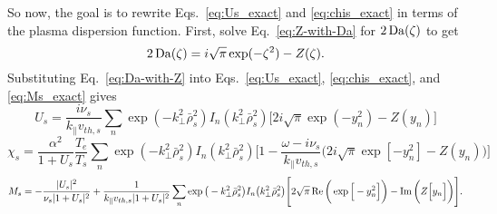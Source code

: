 So now, the goal is to rewrite Eqs.~\ref{eq:Us_exact} and \ref{eq:chis_exact} in terms of the plasma dispersion function.
First, solve Eq.~\ref{eq:Z-with-Da} for $2\operatorname{Da}(\zeta)$ to get
\begin{equation}
	2\operatorname{Da}(\zeta) = i\sqrt{\pi} \exp(-\zeta^2) -Z(\zeta).
	\label{eq:Da-with-Z}
\end{equation}
Substituting Eq.~\ref{eq:Da-with-Z} into Eqs.~\ref{eq:Us_exact}, \ref{eq:chis_exact}, and \ref{eq:Ms_exact} gives
\begin{equation}
	U_s = 
	\frac{i \nu_{s}}{k_\parallel v_{th,s}} 
	\sum_n \exp(-k_\perp^2 \bar{\rho}_s^2) I_n (k_\perp^2 \bar{\rho}_s^2) 
	\Big[ 2 i \sqrt{\pi} \exp(-y_n^2) - Z(y_n)\Big]
	\label{eq:Us_exact_Z}
\end{equation}
\begin{equation}
	\chi_s = 
	\frac{\alpha^2}{1+U_s} \frac{T_e}{T_s} 
	\sum_n \exp(-k_\perp^2 \bar{\rho}_s^2) I_n (k_\perp^2 \bar{\rho}_s^2) 
	\bigg[ 1 - \frac{\omega-i\nu_s}{k_\parallel v_{th,s}} 
	\Big( 2 i \sqrt{\pi} \exp[-y_n^2] - Z(y_n) \Big)
	\bigg]
	\label{eq:chis_exact_Z}
\end{equation}
\begin{equation}
	M_s = - \frac{|U_s|^2}{\nu_s |1+U_s|^2} 
	+ \frac{1}{k_\parallel v_{th,s} |1+U_s|^2}
	\sum_n \exp \big(-k_\perp^2 \bar{\rho}^2_s \big)
	I_n \big( k_\perp^2 \bar{\rho}^2_s \big)
	\Bigg[ 2\sqrt{\pi} \operatorname{Re}\bigg( \exp \Big[-y_n^2\Big] \bigg) - \operatorname{Im} \bigg( Z\Big[y_n\Big] \bigg)  \Bigg].
	\label{eq:Ms_exact_Z}
\end{equation}




